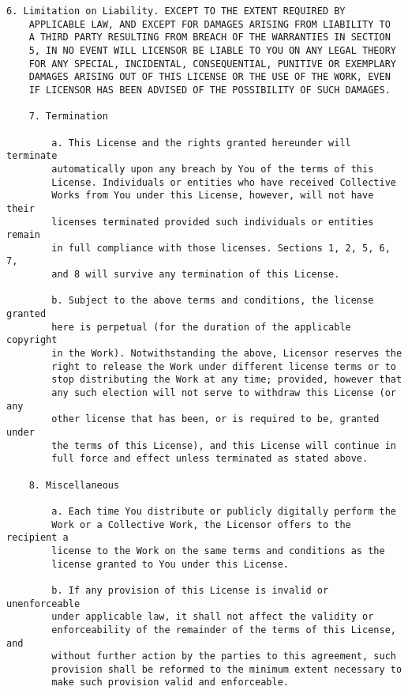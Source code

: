 \begin{Verbatim}[fontsize=\footnotesize]
    6. Limitation on Liability. EXCEPT TO THE EXTENT REQUIRED BY
    APPLICABLE LAW, AND EXCEPT FOR DAMAGES ARISING FROM LIABILITY TO
    A THIRD PARTY RESULTING FROM BREACH OF THE WARRANTIES IN SECTION
    5, IN NO EVENT WILL LICENSOR BE LIABLE TO YOU ON ANY LEGAL THEORY
    FOR ANY SPECIAL, INCIDENTAL, CONSEQUENTIAL, PUNITIVE OR EXEMPLARY
    DAMAGES ARISING OUT OF THIS LICENSE OR THE USE OF THE WORK, EVEN
    IF LICENSOR HAS BEEN ADVISED OF THE POSSIBILITY OF SUCH DAMAGES.
    
    7. Termination
    
        a. This License and the rights granted hereunder will terminate
        automatically upon any breach by You of the terms of this
        License. Individuals or entities who have received Collective
        Works from You under this License, however, will not have their
        licenses terminated provided such individuals or entities remain
        in full compliance with those licenses. Sections 1, 2, 5, 6, 7,
        and 8 will survive any termination of this License.
        
        b. Subject to the above terms and conditions, the license granted
        here is perpetual (for the duration of the applicable copyright
        in the Work). Notwithstanding the above, Licensor reserves the
        right to release the Work under different license terms or to
        stop distributing the Work at any time; provided, however that
        any such election will not serve to withdraw this License (or any
        other license that has been, or is required to be, granted under
        the terms of this License), and this License will continue in
        full force and effect unless terminated as stated above.
    
    8. Miscellaneous
    
        a. Each time You distribute or publicly digitally perform the
        Work or a Collective Work, the Licensor offers to the recipient a
        license to the Work on the same terms and conditions as the
        license granted to You under this License.
    
        b. If any provision of this License is invalid or unenforceable
        under applicable law, it shall not affect the validity or
        enforceability of the remainder of the terms of this License, and
        without further action by the parties to this agreement, such
        provision shall be reformed to the minimum extent necessary to
        make such provision valid and enforceable.
        

\end{Verbatim}
